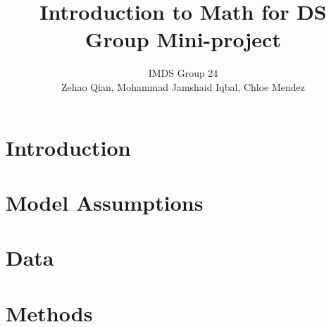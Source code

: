 \documentclass[11pt]{article} %
\title{Introduction to Math for DS Group Mini-project}
\author{IMDS Group 24 \\ Zehao Qian, Mohammad Jamshaid Iqbal, Chloe Mendez}
\begin{document}
\maketitle
% 
% 
% 
% 
% 
% 
% 
% 
% 
% 
\section{Introduction}
% 
% 
% 
% 
% 
% 
% 
\section{Model Assumptions}
% 
% 
% 
% 
% 
% 
% 
\section{Data}
% 
% 
% 
% 
% 
% 
% 
\section{Methods}
% 
% 
% 
% 
% 
% 
% 
\end{document}

